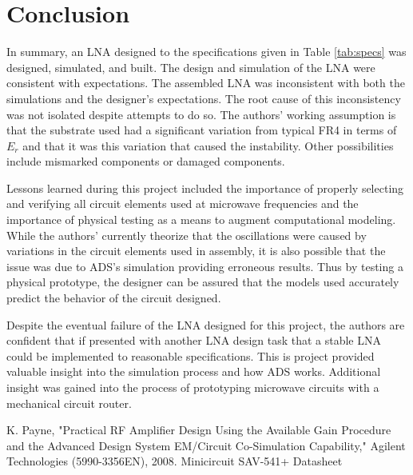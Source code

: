 \documentclass[conference]{IEEEtran}
\begin{document}
\section{Conclusion}
In summary, an LNA designed to the specifications given in Table \ref{tab:specs} was designed, simulated, and built. The design and simulation of the LNA were consistent with expectations. The assembled LNA was inconsistent with both the simulations and the designer's expectations. The root cause of this inconsistency was not isolated despite attempts to do so. The authors' working assumption is that the substrate used had a significant variation from typical FR4 in terms of $E_r$ and that it was this variation that caused the instability. Other possibilities include mismarked components or damaged components. 

Lessons learned during this project included the importance of properly selecting and verifying all circuit elements used at microwave frequencies and the importance of physical testing as a means to augment computational modeling. While the authors' currently theorize that the oscillations were caused by variations in the circuit elements used in assembly, it is also possible that the issue was due to ADS's simulation providing erroneous results. Thus by testing a physical prototype, the designer can be assured that the models used accurately predict the behavior of the circuit designed.

Despite the eventual failure of the LNA designed for this project, the authors are confident that if presented with another LNA design task that a stable LNA could be implemented to reasonable specifications. This is project provided valuable insight into the simulation process and how ADS works. Additional insight was gained into the process of prototyping microwave circuits with a mechanical circuit router.
\begin{thebibliography}{1}
K. Payne, "Practical RF Amplifier Design Using the Available Gain Procedure and the Advanced Design System EM/Circuit Co-Simulation Capability," Agilent Technologies (5990-3356EN), 2008.
Minicircuit SAV-541+ Datasheet
\end{thebibliography}
\end{document}
